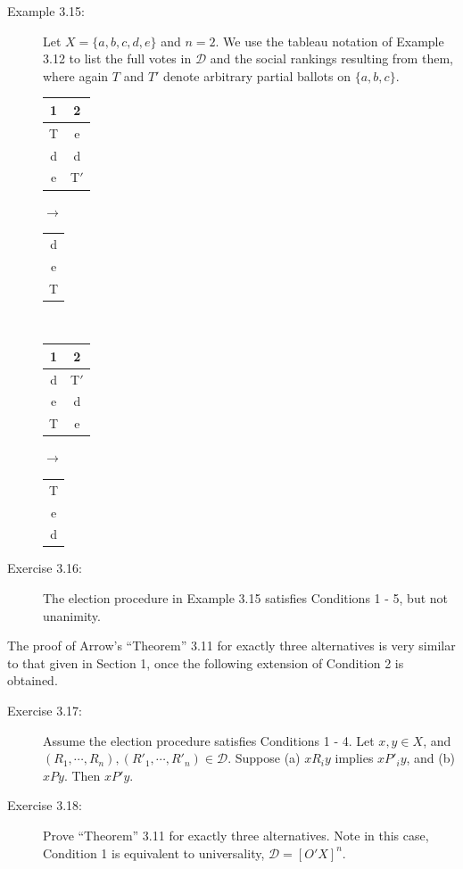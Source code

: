 \documentclass{article}
\begin{document}
\begin{description}

\item[Example 3.15:] Let $X = \{ a, b, c, d, e \}$ and $n = 2$. We use the tableau notation of Example 3.12 to list the full votes in $\mathcal{D}$ and the social rankings resulting from them, where again $T$ and $T'$ denote arbitrary partial ballots on $\{ a, b, c \}$.

\begin{center}
\begin{tabular}{c|c}
  1 & 2 \\
  \hline
  T & e \\
  d & d \\
  e & T$'$ \\
\end{tabular}
$\rightarrow$ 
\begin{tabular}{c}
  \\
  d \\
  e \\
  T \\
\end{tabular}
$\ \ \ \ $
\begin{tabular}{c|c}
  1 & 2 \\
  \hline
  d & T$'$ \\
  e & d \\
  T & e \\
\end{tabular}
$\rightarrow$ 
\begin{tabular}{c}
  \\
  T \\
  e \\
  d \\
\end{tabular}
\end{center}

\item[Exercise 3.16:] The election procedure in Example 3.15 satisfies Conditions 1 - 5, but not unanimity.

\end{description}

The proof of Arrow's ``Theorem'' 3.11 for exactly three alternatives is very similar to that given in Section 1, once the following extension of Condition 2 is obtained.

\begin{description}

\item[Exercise 3.17:] Assume the election procedure satisfies Conditions 1 - 4. Let $x,y \in X$, and $(R_{1},\cdots,R_{n}), (R'_{1},\cdots,R'_{n}) \in \mathcal{D}$. Suppose (a) $xR_{i}y$ implies $xP'_{i}y$, and (b) $xPy$. Then $xP'y$.

\item[Exercise 3.18:] Prove ``Theorem'' 3.11 for exactly three alternatives. Note in this case, Condition 1 is equivalent to universality, $\mathcal{D} = [O'X]^{n}$.

\end{description}
\end{document}
